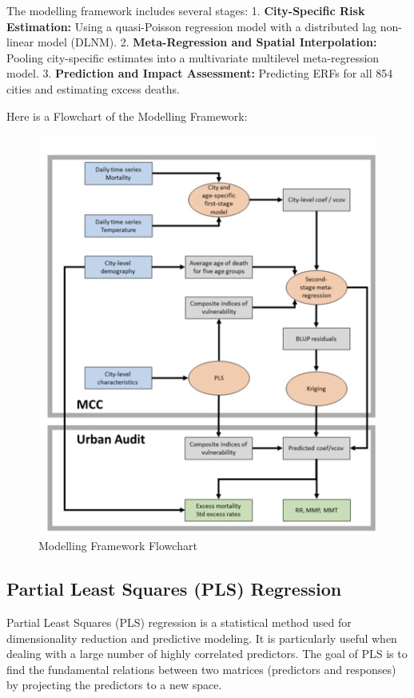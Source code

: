 \documentclass[
]{krantz}
\begin{document}
The modelling framework includes several stages:
1. \textbf{City-Specific Risk Estimation:} Using a quasi-Poisson regression model with a distributed lag non-linear model (DLNM).
2. \textbf{Meta-Regression and Spatial Interpolation:} Pooling city-specific estimates into a multivariate multilevel meta-regression model.
3. \textbf{Prediction and Impact Assessment:} Predicting ERFs for all 854 cities and estimating excess deaths.

Here is a Flowchart of the Modelling Framework:

\begin{figure}
\centering
\includegraphics{work/09-epidemiologic/figures/Bild11.png}
\caption{Modelling Framework Flowchart}
\end{figure}

\subsection{Partial Least Squares (PLS) Regression}\label{partial-least-squares-pls-regression}

Partial Least Squares (PLS) regression is a statistical method used for dimensionality reduction and predictive modeling. It is particularly useful when dealing with a large number of highly correlated predictors. The goal of PLS is to find the fundamental relations between two matrices (predictors and responses) by projecting the predictors to a new space.
\end{document}
